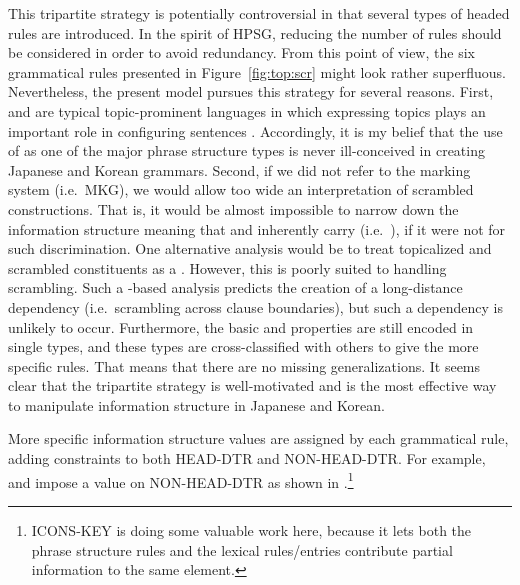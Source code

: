 This tripartite strategy is potentially controversial in that several
types of headed rules are introduced. In the spirit of HPSG,
reducing the number of rules should be considered in order to avoid
redundancy. From this point of view, the six grammatical rules
presented in Figure~\ref{fig:top:scr} might look rather superfluous.
Nevertheless, the present model pursues this strategy for several
reasons. First,  and  are typical
topic-prominent languages in which expressing topics plays an
important role in configuring sentences
\citep{li:thompson:76,sohn:01}. Accordingly, it is my belief that the
use of  as one of the major phrase structure types
is never ill-conceived in creating Japanese and Korean
grammars. Second, if we did not refer to the marking system
(i.e.\ MKG), we would allow too wide an interpretation of
scrambled constructions. That is, it would be almost impossible to
narrow down the information structure meaning that \wa and \nun
inherently carry (i.e.\ ), if it were not for
such discrimination.  One alternative analysis would be to treat
topicalized and scrambled constituents as a .
However, this is poorly suited to handling scrambling.  Such a
-based analysis predicts the creation of a
long-distance dependency (i.e.\ scrambling across clause
boundaries), but such a dependency is unlikely to
occur. Furthermore, the basic  and 
properties are still encoded in single types, and these types are
cross-classified with others to give the more specific rules. That
means that there are no missing generalizations.  It seems clear that
the tripartite strategy is well-motivated and is the most effective
way to manipulate information structure in Japanese and Korean.



More specific information structure values are assigned by each
grammatical rule, adding constraints to both HEAD-DTR and
NON-HEAD-DTR. For example,  and
 impose a value on NON-HEAD-DTR as shown in
.\footnote{ICONS-KEY is doing some valuable work
  here, because it lets both the phrase structure rules
  and the lexical rules/entries contribute partial information to the
  same  element.}


